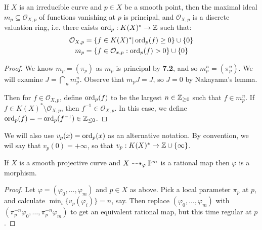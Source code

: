\documentclass[10pt,a4paper,rgb]{article}
\begin{document}
\begin{corollary}
If $X$ is an irreducible curve and $p \in X$ be a smooth point, then the maximal ideal $m_p \subseteq \mathcal{O}_{X,p}$ of functions vanishing at $p$ is principal, and $\mathcal{O}_{X,p}$ is a discrete valuation ring, i.e. there exists $\ord_p : K(X)^\ast \to \Z$ such that:
\begin{align*}
\mathcal{O}_{X,p} &= \{f \in K(X)^\ast |\ord_p(f) \geq 0\} \cup \{0\}\\
m_p &= \{f \in \mathcal{O}_{x,p} : \ord_p(f) > 0\}\cup\{0\}
\end{align*}
\end{corollary}
\begin{proof}
We know $m_p = (\pi_p)$ as $m_p$ is principal by \textbf{7.2}, and so $m_p^n = (\pi_p^n)$. We will examine $J = \bigcap_n m_p^n$. Observe that $m_p J = J$, so $J = 0$ by Nakayama's lemma.

Then for $f \in \mathcal{O}_{X,p}$, define $\ord_p(f)$ to be the largest $n \in \Z_{\geq 0}$ such that $f \in m_p^n$. If $f \in K(X)^\ast\setminus \mathcal{O}_{X,p}$, then $f^{-1} \in \mathcal{O}_{X,p}$. In this case, we define $\ord_p(f) = -\ord_p(f^{-1}) \in \Z_{\leq 0}$.
\end{proof}
We will also use $v_p(x) = \ord_p(x)$ as an alternative notation. By convention, we wil say that $v_p(0) = +\infty$, so that $v_p:K(X)^{\ast} \to \Z\cup\{\infty\}$.

\begin{corollary}
If $X$ is a smooth projective curve and $X \dashrightarrow_\varphi \P^m$ is a rational map then $\varphi$ is a morphism.
\end{corollary}
\begin{proof}
Let $\varphi = (\varphi_0, \ldots, \varphi_m)$ and $p \in X$ as above. Pick a local parameter $\pi_p$ at $p$, and calculate $\min_i\{v_p(\varphi_i)\} = n$, say. Then replace $(\varphi_0, \ldots, \varphi_m)$ with $(\pi_p^{-n}\varphi_0, \ldots, \pi_p^{-n}\varphi_m)$ to get an equivalent rational map, but this time regular at $p$.
\end{proof}
\end{document}
